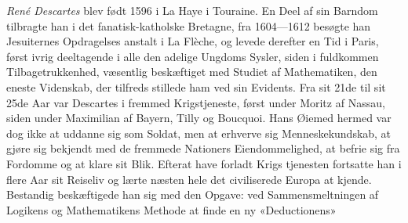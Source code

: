 \documentclass[12pt,a4paper]{book}
\begin{document}
\emph{René Descartes} blev født 1596 i La Haye i Touraine.
En Deel af sin Barndom tilbragte han i det fanatisk-katholske
Bretagne, fra 1604---1612 besøgte han Jesuiternes Opdragelses\-%
anstalt i La Flèche, og levede derefter en Tid i Paris, først
ivrig deeltagende i alle den adelige Ungdoms Sysler, siden i
fuldkommen Tilbagetrukkenhed, væsentlig beskæftiget med
Studiet af Mathematiken, den eneste Videnskab, der tilfreds\-%
stillede ham ved sin Evidents. Fra sit 21de til sit 25de Aar
var Descartes i fremmed Krigstjeneste, først under Moritz af
Nassau, siden under Maximilian af Bayern, Tilly og Boucquoi.
Hans Øiemed hermed var dog ikke at uddanne sig som Soldat,
men at erhverve sig Menneskekundskab, at gjøre sig bekjendt
med de fremmede Nationers Eiendommelighed, at befrie sig
fra Fordomme og at klare sit Blik. Efterat have forladt Krigs\-%
tjenesten fortsatte han i flere Aar sit Reiseliv og lærte næsten
hele det civiliserede Europa at kjende. Bestandig beskæftigede
han sig med den Opgave: ved Sammensmeltningen af Logikens
og Mathematikens Methode at finde en ny «Deductionens»
\end{document}
